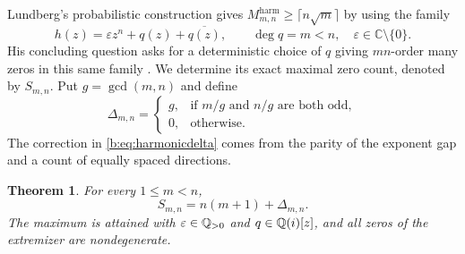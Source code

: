\documentclass[UTF8,11pt]{ctexart}
\newtheorem{thm}{Theorem}[section]
\theoremstyle{definition}
\numberwithin{equation}{section}
\newcommand{\C}{\mathbb C}\newcommand{\R}{\mathbb R}
\begin{document}
Lundberg's probabilistic construction gives
$M^{\mathrm{harm}}_{m,n}\ge\lceil n\sqrt m\rceil$ by using the family
\begin{equation}\label{b:eq:harmonicfamily}
 h(z)=\varepsilon z^n+q(z)+\overline{q(z)},\qquad
 \deg q=m<n,\quad \varepsilon\in\C\setminus\{0\}.
\end{equation}
His concluding question asks for a deterministic choice of $q$ giving
$mn$-order many zeros in this same family
\cite[Section~4.2, \av, p.~9]{Lun23}.
We determine its exact maximal zero count, denoted by $S_{m,n}$.
Put $g=\gcd(m,n)$ and define
\begin{equation}\label{b:eq:harmonicdelta}
 \Delta_{m,n}=
 \begin{cases}
  g,&\text{if $m/g$ and $n/g$ are both odd},\\
  0,&\text{otherwise}.
 \end{cases}
\end{equation}
The correction in \eqref{b:eq:harmonicdelta} comes from the parity of
the exponent gap and a count of equally spaced directions.
\begin{thm}\label{b:thm:harmonic}
For every $1\le m<n$,
\begin{equation}\label{b:eq:harmonicexact}
 S_{m,n}=n(m+1)+\Delta_{m,n}.
\end{equation}
The maximum is attained with $\varepsilon\in\mathbb Q_{>0}$ and
$q\in\mathbb Q(i)[z]$, and all zeros of the extremizer are nondegenerate.
\end{thm}
\end{document}
